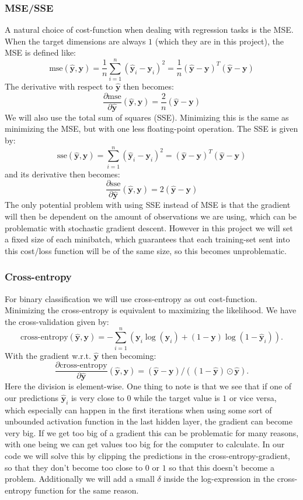 \documentclass{article}
\begin{document}
\subsubsection{MSE/SSE}
A natural choice of cost-function when dealing with regression tasks is the MSE.
When the target dimensions are always $1$ (which they are in this project), the
MSE is defined like:
$$\text{mse}(\hat{\bm{y}}, \bm{y}) = \frac{1}{n} \sum_{i=1}^n (\hat{\bm{y}}_i - \bm{y}_i)^2 = \frac{1}{n}(\hat{\bm{y}} - \bm{y})^T (\hat{\bm{y}} - \bm{y})$$
The derivative with respect to $\hat{\bm{y}}$ then becomes:
$$\frac{\partial \text{mse}}{\partial \hat{\bm{y}}}(\hat{\bm{y}}, \bm{y}) = \frac{2}{n} (\hat{\bm{y}} - \bm{y})$$
We will also use the total sum of squares (SSE). Minimizing this is the same as
minimizing the MSE, but with one less floating-point operation. The SSE is given
by:
$$\text{sse}(\hat{\bm{y}}, \bm{y}) = \sum_{i=1}^n (\hat{\bm{y}}_i - \bm{y}_i)^2 = (\hat{\bm{y}} - \bm{y})^T (\hat{\bm{y}} - \bm{y})$$
and its derivative then becomes:
$$\frac{\partial \text{sse}}{\partial \hat{\bm{y}}}(\hat{\bm{y}}, \bm{y}) = 2(\hat{\bm{y}} - \bm{y})$$
The only potential problem with using SSE instead of MSE is that the gradient
will then be dependent on the amount of observations we are using, which can be
problematic with stochastic gradient descent. However in this project we will
set a fixed size of each minibatch, which guarantees that each training-set sent
into this cost/loss function will be of the same size, so this becomes
unproblematic.

\subsubsection{Cross-entropy}
For binary classification we will use cross-entropy as out cost-function.
Minimizing the cross-entropy is equivalent to maximizing the likelihood. We have
the cross-validation given by:
$$\text{cross-entropy}(\hat{\bm{y}}, \bm{y}) = -\sum_{i=1}^{n} ( \bm{y}_{i} \log(\hat{\bm{y}}_i) + (1 - \bm{y}) \log(1 - \hat{\bm{y}}_i) ).$$
With the gradient w.r.t. $\hat{\bm{y}}$ then becoming:
$$\frac{\partial \text{cross-entropy}}{\partial \hat{\bm{y}}}(\hat{\bm{y}}, \bm{y}) = (\hat{\bm{y}} - \bm{y}) / ((1 - \hat{\bm{y}}) \odot \hat{\bm{y}}).$$
Here the division is element-wise. One thing to note is that we see that if one of
our predictions $\hat{\bm{y}}_i$ is very close to $0$ while the target value is $1$
or vice versa, which especially can happen in the first iterations when using
some sort of unbounded activation function in the last hidden layer, the
gradient can become very big. If we get too big of a gradient this can be
problematic for many reasons, with one being we can get values too big for the
computer to calculate. In our code we will solve this by clipping the
predictions in the cross-entropy-gradient, so that they don't become too close
to $0$ or $1$ so that this doesn't become a problem. Additionally we will add a
small $\delta$ inside the log-expression in the cross-entropy function for the
same reason.
\end{document}
